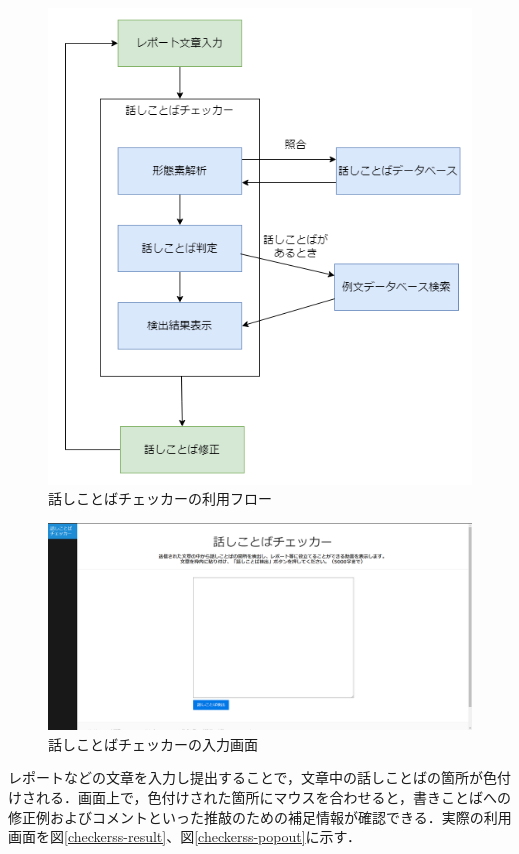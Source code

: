 \begin{figure}[H]
	\centering
 	\includegraphics[width=120mm]{image/checker-flow.png}
	\caption{話しことばチェッカーの利用フロー}
	\label{checkerss-flow}
\end{figure}

\begin{figure}[H] %
	\centering
 	\includegraphics[width=150mm]{image/checkerss-plain.png}
	\caption{話しことばチェッカーの入力画面}
	\label{checkerss-plain}
\end{figure}

レポートなどの文章を入力し提出することで，文章中の話しことばの箇所が色付けされる．画面上で，色付けされた箇所にマウスを合わせると，書きことばへの修正例およびコメントといった推敲のための補足情報が確認できる．実際の利用画面を図\ref{checkerss-result}、図\ref{checkerss-popout}に示す．

